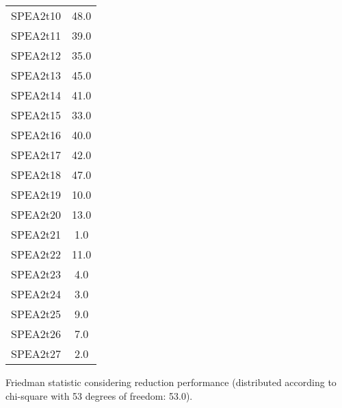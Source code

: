 \documentclass{article}
\begin{document}
\begin{table}[!htp]
\begin{tabular}{c|c}
SPEA2t10&48.0\\
SPEA2t11&39.0\\
SPEA2t12&35.0\\
SPEA2t13&45.0\\
SPEA2t14&41.0\\
SPEA2t15&33.0\\
SPEA2t16&40.0\\
SPEA2t17&42.0\\
SPEA2t18&47.0\\
SPEA2t19&10.0\\
SPEA2t20&13.0\\
SPEA2t21&1.0\\
SPEA2t22&11.0\\
SPEA2t23&4.0\\
SPEA2t24&3.0\\
SPEA2t25&9.0\\
SPEA2t26&7.0\\
SPEA2t27&2.0\\
\end{tabular}
\end{table}


Friedman statistic considering reduction performance (distributed according to chi-square with 53 degrees of freedom: 53.0).
\end{document}
